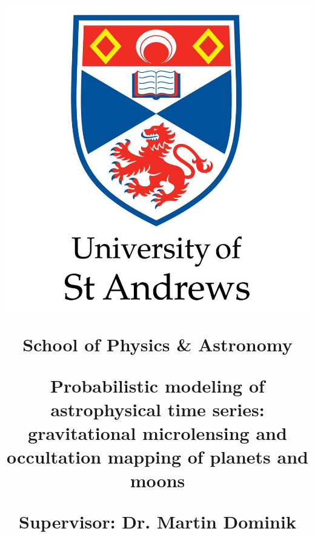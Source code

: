 \documentclass[]{report}
\begin{document}
\title{\vspace{-15pt}\begin{center}\includegraphics[width=0.4\linewidth]{static/misc/logo.jpg}\end{center}
    \vspace{20pt}
    \begin{center}
        School of Physics \& Astronomy
    \end{center}
    \vspace{20pt}
    \begin{center}
        \LARGE\textbf{Probabilistic modeling of astrophysical time series:
            gravitational microlensing and occultation mapping of planets and moons}
    \end{center}
    \vspace{20pt}
    \begin{center}
        Supervisor: Dr. Martin Dominik
    \end{center}
}

\maketitle
\tableofcontents
\end{document}
